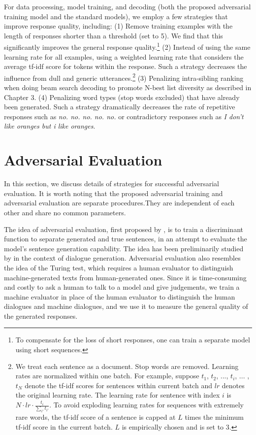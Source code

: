 For 
data processing, 
model training, and decoding  (both the proposed adversarial training model and the standard \sts models), we employ a few  strategies that  improve response quality, including: 
(1) Remove training examples with the length of responses shorter than a threshold (set to 5).
We find that this significantly improves the general response quality.\footnote{To compensate for the loss of short responses, one can train a separate model using short sequences.}
(2) Instead of using the same learning rate for all examples, using a weighted learning rate that considers the average tf-idf score for tokens within the response.
Such a strategy
 decreases the influence from dull and generic utterances.\footnote{We treat each sentence as a document. Stop words are removed.
 Learning rates are normalized within one batch. 
 For example, suppose $t_1$, $t_2$, ..., $t_i$, ... ,$t_N$ denote the tf-idf scores for  sentences within current batch and $lr$ denotes the original learning rate. The learning rate for sentence with index $i$ is $N\cdot lr\cdot \frac{t_i}{\sum_{i'}t_{i'}}$. 
 To avoid exploding learning rates for sequences with extremely rare words, the tf-idf score of a sentence 
 is capped at $L$ times the minimum tf-idf score in the current batch. $L$ is empirically chosen and is set to 3.
  } (3) Penalizing intra-sibling ranking when doing beam search decoding to promote N-best list diversity as described in Chapter 3.  (4) Penalizing word types (stop words excluded) that have already been generated. Such a strategy dramatically decreases the rate of repetitive responses such as {\it no. no. no. no. no.} or contradictory responses such as {\it I don't like oranges but i like oranges}. 

\section{Adversarial Evaluation}
In this section, we discuss details of strategies for successful adversarial evaluation. 
It is worth noting that 
 the proposed adversarial training and adversarial evaluation are separate procedures.They are independent of each other and share no common parameters. 


 The idea of adversarial evaluation, first proposed by 
, is to 
train a discriminant
function
 to separate  generated and
true sentences, in an attempt to evaluate the model's sentence generation capability.
The idea has been preliminarily studied by  in the context of dialogue generation. 
Adversarial evaluation  also resembles the idea of the Turing test,
which requires a human evaluator 
to distinguish  machine-generated texts from human-generated ones. 
Since it is time-consuming and costly to 
 ask a human to talk to a model 
and give judgements,
we  train a machine evaluator
in place of the  human evaluator to distinguish the human dialogues and machine dialogues, and we use it to measure 
 the general quality of the generated responses. 

